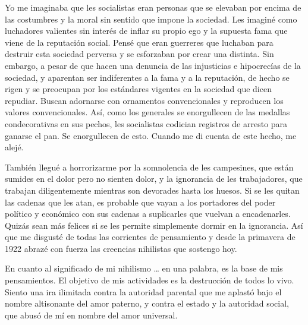 \documentclass[
]{book}
\begin{document}
Yo me imaginaba que les socialistas eran personas que se elevaban por encima de las costumbres y la moral sin sentido que impone la sociedad. Les imaginé como luchadores valientes sin interés de inflar su propio ego y la supuesta fama que viene de la reputación social. Pensé que eran guerreres que luchaban para destruir esta sociedad perversa y se esforzaban por crear una distinta. Sin embargo, a pesar de que hacen una denuncia de las injusticias e hipocrecías de la sociedad, y aparentan ser indiferentes a la fama y a la reputación, de hecho se rigen y se preocupan por los estándares vigentes en la sociedad que dicen repudiar. Buscan adornarse con ornamentos convencionales y reproducen los valores convencionales. Así, como los generales se enorgullecen de las medallas condecorativas en sus pechos, les socialistas codician registros de arresto para ganarse el pan. Se enorgullecen de esto. Cuando me di cuenta de este hecho, me alejé.

También llegué a horrorizarme por la somnolencia de les campesines, que están sumides en el dolor pero no sienten dolor, y la ignorancia de les trabajadores, que trabajan diligentemente mientras son devorades hasta los huesos. Si se les quitan las cadenas que les atan, es probable que vayan a los portadores del poder político y económico con sus cadenas a suplicarles que vuelvan a encadenarles. Quizás sean más felices si se les permite simplemente dormir en la ignorancia. Así que me disgusté de todas las corrientes de pensamiento y desde la primavera de 1922 abrazé con fuerza las creencias nihilistas que sostengo hoy.

En cuanto al significado de mi nihilismo \ldots{} en una palabra, es la base de mis pensamientos. El objetivo de mis actividades es la destrucción de todos lo vivo. Siento una ira ilimitada contra la autoridad parental que me aplastó bajo el nombre altisonante del amor paterno, y contra el estado y la autoridad social, que abusó de mí en nombre del amor universal.
\end{document}
